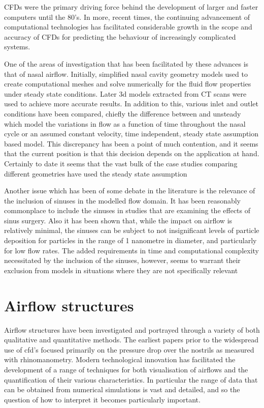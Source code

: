 CFDs were the primary driving force behind the development of larger and faster computers until the 80's\cite{Wendt2009}. In more, recent times, the continuing advancement of computational technologies has facilitated considerable growth in the scope and accuracy of CFDs for predicting the behaviour of increasingly complicated systems\cite{Tu2008}. 

One of the areas of investigation that has been facilitated by these advances is that of nasal airflow. Initially, simplified nasal cavity geometry models used to create computational meshes and solve numerically for the fluid flow properties under steady state conditions\cite{Keyhani1995, Hahn1993}. Later 3d models extracted from CT scans were used to achieve more accurate results\cite{Martonen2002}. In addition to this, various inlet and outlet conditions have been compared, chiefly the difference between and unsteady  which model the variations in flow as a function of time throughout the nasal cycle\cite{Shi2006} or an assumed constant velocity, time independent, steady state assumption based model\cite{Wen2008}. This discrepancy has been a point of much contention, and it seems that the current position is that this decision depends on the application at hand\cite{Doorly2008c}. Certainly to date it seems that the vast bulk of the case studies comparing different geometries have used the steady state assumption\cite{Xi2012, Zhu2011, Garcia2007}

Another issue which has been of some debate in the literature is the relevance of the inclusion of sinuses in the modelled flow domain. It has been reasonably commonplace to include the sinuses in studies that are examining the effects of sinus surgery\cite{Xiong2008a, Lindemann2005}. Also it has been shown that, while the impact on airflow is relatively minimal, the sinuses can be subject to not insignificant levels of particle deposition for particles in the range of 1 nanometre in diameter, and particularly for low flow rates\cite{Ge2012}. The added  requirements in time and computational complexity necessitated by the inclusion of the sinuses, however, seems to warrant their exclusion from models in situations where they are not specifically relevant\cite{Doorly2008c}



\section{Airflow structures}
Airflow structures have been investigated and portrayed through a variety of both qualitative and quantitative methods. The earliest papers prior to the widespread use of cfd's focused primarily on the pressure drop over the nostrils as measured with rhinomanometry\cite{Martin1981}. Modern technological innovation has facilitated the development of a range of techniques for both visualisation of airflows and the quantification of their various characteristics. In particular the range of data that can be obtained from numerical simulations is vast and detailed, and so the question of how to interpret it becomes particularly important.

